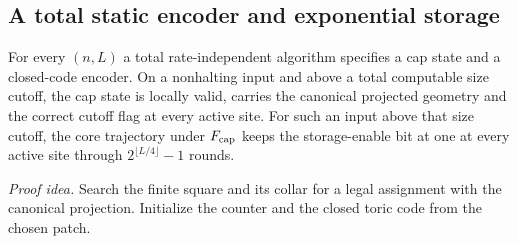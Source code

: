 \subsection{A total static encoder and exponential storage}\label{v:positive}
\begin{lemma}\label{v:encoder}
For every \((n,L)\) a total rate-independent algorithm specifies a cap
state and a closed-code encoder. On a nonhalting input and above a total computable size cutoff,
the cap state is locally valid, carries the canonical projected geometry
and the correct cutoff flag at every active site. For such an input above that size cutoff, the core trajectory under \(F_{\rm cap}\) keeps the storage-enable bit at one at every active site through
\(2^{\lfloor L/4\rfloor}-1\) rounds.
\end{lemma}
\par\noindent\emph{Proof idea.} Search the finite square and its collar for a legal assignment with the canonical projection. Initialize the counter and the closed toric code from the chosen patch.

